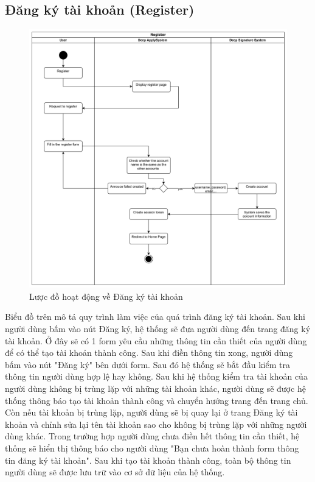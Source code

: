 \subsection{Đăng ký tài khoản (Register)}

\begin{figure}[H]

	\centering
    \includegraphics[scale=0.08]{img/Register_workflow.png}
    \caption{Lược đồ hoạt động về Đăng ký tài khoản}

\end{figure}

Biểu đồ trên mô tả quy trình làm việc của quá trình đăng ký tài khoản. Sau khi người dùng bấm vào nút Đăng ký, hệ thống sẽ đưa người dùng đến trang đăng ký tài khoản. Ở đây sẽ có 1 form yêu cầu những thông tin cần thiết của người dùng để có thể tạo tài khoản thành công. Sau khi điền thông tin xong, người dùng bấm vào nút "Đăng ký" bên dưới form. Sau đó hệ thống sẽ bắt đầu kiểm tra thông tin người dùng hợp lệ hay không. Sau khi hệ thống kiểm tra tài khoản của người dùng không bị trùng lặp với những tài khoản khác, người dùng sẽ được hệ thống thông báo tạo tài khoản thành công và chuyển hướng trang đến trang chủ. Còn nếu tài khoản bị trùng lặp, người dùng sẽ bị quay lại ở trang Đăng ký tài khoản và chỉnh sửa lại tên tài khoản sao cho không bị trùng lặp với những người dùng khác. Trong trường hợp người dùng chưa điền hết thông tin cần thiết, hệ thống sẽ hiển thị thông báo cho người dùng "Bạn chưa hoàn thành form thông tin đăng ký tài khoản". Sau khi tạo tài khoản thành công, toàn bộ thông tin người dùng sẽ được lưu trữ vào cơ sở dữ liệu của hệ thống.

